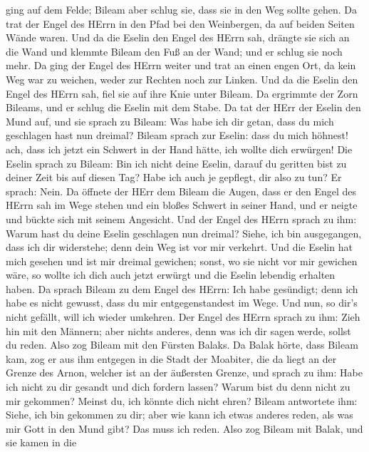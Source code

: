 ging auf dem Felde; Bileam aber schlug sie, dass sie in den Weg sollte
gehen.  Da trat der Engel des HErrn in den Pfad bei den
Weinbergen, da auf beiden Seiten Wände waren.  Und da die
Eselin den Engel des HErrn sah, drängte sie sich an die Wand und klemmte
Bileam den Fuß an der Wand; und er schlug sie noch mehr. 
Da ging der Engel des HErrn weiter und trat an einen engen Ort, da kein
Weg war zu weichen, weder zur Rechten noch zur Linken.  Und
da die Eselin den Engel des HErrn sah, fiel sie auf ihre Knie unter
Bileam. Da ergrimmte der Zorn Bileams, und er schlug die Eselin mit dem
Stabe.  Da tat der HErr der Eselin den Mund auf, und sie
sprach zu Bileam: Was habe ich dir getan, dass du mich geschlagen hast
nun dreimal?  Bileam sprach zur Eselin: dass du mich
höhnest! ach, dass ich jetzt ein Schwert in der Hand hätte, ich wollte
dich erwürgen!  Die Eselin sprach zu Bileam: Bin ich nicht
deine Eselin, darauf du geritten bist zu deiner Zeit bis auf diesen Tag?
Habe ich auch je gepflegt, dir also zu tun? Er sprach: Nein.
 Da öffnete der HErr dem Bileam die Augen, dass er den
Engel des HErrn sah im Wege stehen und ein bloßes Schwert in seiner
Hand, und er neigte und bückte sich mit seinem Angesicht. 
Und der Engel des HErrn sprach zu ihm: Warum hast du deine Eselin
geschlagen nun dreimal? Siehe, ich bin ausgegangen, dass ich dir
widerstehe; denn dein Weg ist vor mir verkehrt.  Und die
Eselin hat mich gesehen und ist mir dreimal gewichen; sonst, wo sie
nicht vor mir gewichen wäre, so wollte ich dich auch jetzt erwürgt und
die Eselin lebendig erhalten haben.  Da sprach Bileam zu
dem Engel des HErrn: Ich habe gesündigt; denn ich habe es nicht gewusst,
dass du mir entgegenstandest im Wege. Und nun, so dir's nicht gefällt,
will ich wieder umkehren.  Der Engel des HErrn sprach zu
ihm: Zieh hin mit den Männern; aber nichts anderes, denn was ich dir
sagen werde, sollst du reden. Also zog Bileam mit den Fürsten Balaks.
 Da Balak hörte, dass Bileam kam, zog er aus ihm entgegen
in die Stadt der Moabiter, die da liegt an der Grenze des Arnon, welcher
ist an der äußersten Grenze,  und sprach zu ihm: Habe ich
nicht zu dir gesandt und dich fordern lassen? Warum bist du denn nicht
zu mir gekommen? Meinst du, ich könnte dich nicht ehren? 
Bileam antwortete ihm: Siehe, ich bin gekommen zu dir; aber wie kann ich
etwas anderes reden, als was mir Gott in den Mund gibt? Das muss ich
reden.  Also zog Bileam mit Balak, und sie kamen in die
